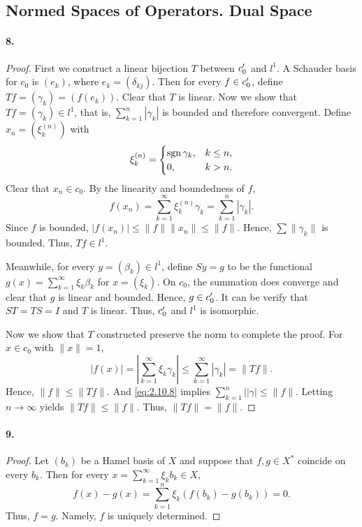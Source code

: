 \subsection{Normed Spaces of Operators. Dual Space}
  \paragraph{8.}
  \begin{proof}
    First we construct a linear bijection $T$ between $c_0^\prime$ and $l^1$. A 
    Schauder basis for $c_0$ is $(e_k)$, where $e_k=(\delta_{kj})$. Then for 
    every $f\in c_0^\prime$, define $Tf=(\gamma_k)=(f(e_k))$. Clear that $T$ is 
    linear. Now we show that $Tf=(\gamma_k)\in l^1$, that is, $\sum_{k=1}^n|
    \gamma_k|$ is bounded and therefore convergent. Define $x_n=(\xi_k^{(n)})$
    with
    \[
      \xi_k^{(n)}=\begin{cases}
        \operatorname{sgn}\gamma_k, & k\le n, \\
        0,            & k>n.
      \end{cases}
    \]
    Clear that $x_n\in c_0$. By the linearity and boundedness of $f$, 
    \begin{equation}
      \label{eq:2.10.8}
      f(x_n)=\sum_{k=1}^\infty \xi_k^{(n)}\gamma_k = \sum_{k=1}^n|\gamma_k|.
    \end{equation}
    Since $f$ is bounded, $|f(x_n)| \le \|f\|\|x_n\| \le \|f\|$. Hence, $\sum\|
    \gamma_k\|$ is bounded. Thus, $Tf\in l^1$.\par
    Meanwhile, for every $y=(\beta_k)\in l^1$, define $Sy=g$ to be the
    functional $g(x)=\sum_{k=1}^\infty\xi_k\beta_k$ for $x=(\xi_k)$. On $c_0$,
    the summation does converge and clear that $g$ is linear and bounded. Hence,
    $g\in c_0^\prime$. It can be verify that $ST=TS=I$ and $T$ is linear. Thus, $c_0
    ^\prime$ and $l^1$ is isomorphic.\par
    Now we show that $T$ constructed preserve the norm to complete the proof.
    For $x\in c_0$ with $\|x\|=1$,
    \[
      |f(x)| = \left|\sum_{k=1}^\infty \xi_k\gamma_k\right|\le 
      \sum_{k=1}^\infty |\gamma_k| = \|Tf\|.
    \]
    Hence, $\|f\|\le\|Tf\|$. And \eqref{eq:2.10.8} implies $\sum_{k=1}^n||\gamma
    |\le \|f\|$. Letting $n\to\infty$ yields $\|Tf\|\le \|f\|$. Thus, $\|Tf\|=
    \|f\|$. 
  \end{proof}

  \paragraph{9.}
  \begin{proof}
    Let $(b_k)$ be a Hamel basis of $X$ and suppose that $f,g\in X^*$ coincide
    on every $b_k$. Then for every $x=\sum_{k=1}^\infty\xi_k b_k\in X$, 
    \[
      f(x)-g(x) = \sum_{k=1}^n\xi_k(f(b_k)-g(b_k)) = 0.
    \]
    Thus, $f=g$. Namely, $f$ is uniquely determined.
  \end{proof}

